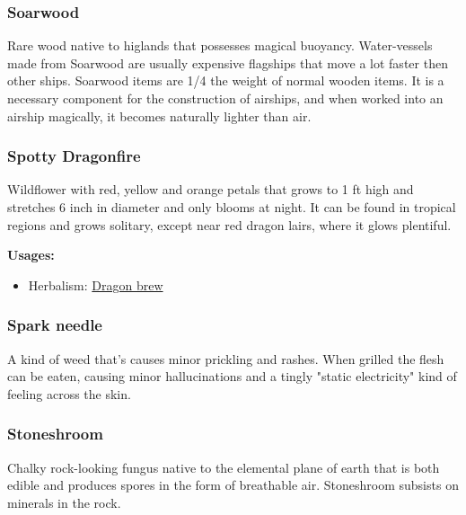 \subsubsection{Soarwood}

Rare wood native to higlands that possesses magical buoyancy. Water-vessels made from Soarwood are usually expensive flagships that move a lot faster then other ships. Soarwood items are 1/4 the weight of normal wooden items. It is a necessary component for the construction of airships, and when worked into an airship magically, it becomes naturally lighter than air.

\subsubsection{Spotty Dragonfire}
\label{Spotty Dragonfire}

Wildflower with red, yellow and orange petals that grows to 1 ft high and stretches 6 inch in diameter and only blooms at night. It can be found in tropical regions and grows solitary, except near red dragon lairs, where it glows plentiful.

\vspace{5mm}

\textbf{Usages:}

\begin{itemize}[noitemsep]
\item[] Herbalism: \hyperref[Dragon brew]{Dragon brew}
\end{itemize}

\subsubsection{Spark needle}
\label{spark_needle}

A kind of weed that's causes minor prickling and rashes. When grilled the flesh can be eaten, causing minor hallucinations and a tingly "static electricity" kind of feeling across the skin.

\subsubsection{Stoneshroom}
\label{Stoneshroom}

Chalky rock-looking fungus native to the elemental plane of earth that is both edible and produces spores in the form of breathable air. Stoneshroom subsists on minerals in the rock.

\vspace{5mm}

